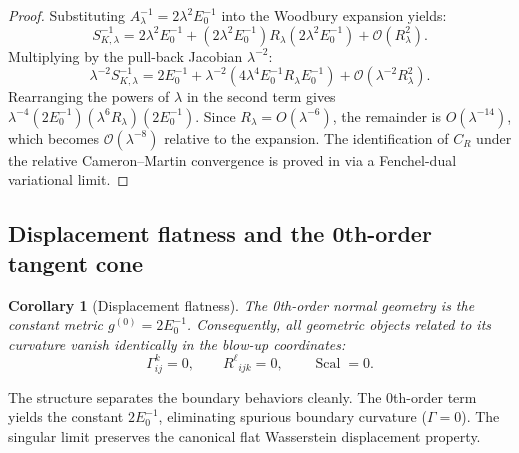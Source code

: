 \documentclass[11pt]{amsart}
\theoremstyle{plain}
\newtheorem{corollary}[theorem]{Corollary}
\theoremstyle{definition}
\theoremstyle{remark}
\begin{document}
    \begin{proof}
        Substituting $A_\lambda^{-1} = 2\lambda^2 E_0^{-1}$ into the Woodbury expansion yields:
        \begin{equation}
            S_{K,\lambda}^{-1} = 2\lambda^2 E_0^{-1} + (2\lambda^2 E_0^{-1}) R_\lambda (2\lambda^2 E_0^{-1}) + \mathcal{O}(R_\lambda^2).
        \end{equation}
        Multiplying by the pull-back Jacobian $\lambda^{-2}$:
        \begin{equation}
            \lambda^{-2} S_{K,\lambda}^{-1} = 2E_0^{-1} + \lambda^{-2}(4\lambda^4 E_0^{-1} R_\lambda E_0^{-1}) + \mathcal{O}(\lambda^{-2} R_\lambda^2).
        \end{equation}
        Rearranging the powers of $\lambda$ in the second term gives $\lambda^{-4} (2E_0^{-1})(\lambda^6 R_\lambda)(2E_0^{-1})$. Since $R_\lambda = O(\lambda^{-6})$, the remainder is $O(\lambda^{-14})$, which becomes $\mathcal{O}(\lambda^{-8})$ relative to the expansion. The identification of $C_R$ under the relative Cameron--Martin convergence is proved in  via a Fenchel-dual variational limit.
    \end{proof}

    \subsection{Displacement flatness and the 0th-order tangent cone}

    \begin{corollary}[Displacement flatness]
        \label{cor:displacement_flatness}
        The 0th-order normal geometry is the constant metric $g^{(0)} = 2E_0^{-1}$. Consequently, all geometric objects related to its curvature vanish identically in the blow-up coordinates:
        \begin{equation}
            \Gamma^k_{ij}=0,\qquad
            R^\ell{}_{ijk}=0,\qquad
            \operatorname{Scal}=0.
        \end{equation}
    \end{corollary}

    The structure separates the boundary behaviors cleanly. The 0th-order term yields the constant $2E_0^{-1}$, eliminating spurious boundary curvature ($\Gamma = 0$). The singular limit preserves the canonical flat Wasserstein displacement property.
\end{document}
